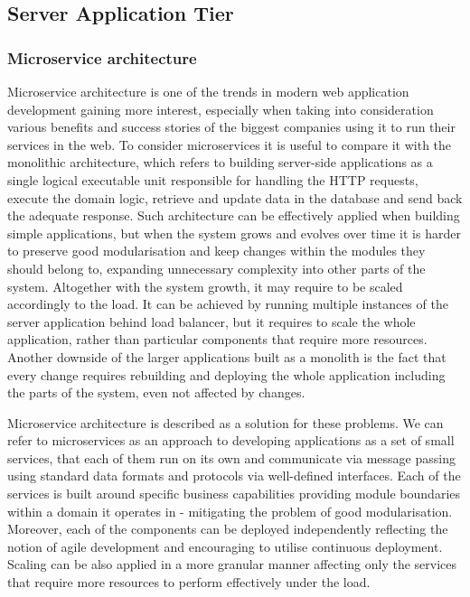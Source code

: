 \subsection{Server Application Tier}


\subsubsection{Microservice architecture}

Microservice architecture is one of the trends in modern web application development gaining more interest, especially when taking into consideration various benefits and success stories of the biggest companies using it to run their services in the web. To consider microservices it is useful to compare it with the monolithic architecture, which refers to building server-side applications as a single logical executable unit responsible for handling the HTTP requests, execute the domain logic, retrieve and update data in the database and send back the adequate response. Such architecture can be effectively applied when building simple applications, but when the system grows and evolves over time it is harder to preserve good modularisation and keep changes within the modules they should belong to, expanding unnecessary complexity into other parts of the system. Altogether with the system growth, it may require to be scaled accordingly to the load. It can be achieved by running multiple instances of the server application behind load balancer, but it requires to scale the whole application, rather than particular components that require more resources. Another downside of the larger applications built as a monolith is the fact that every change requires rebuilding and deploying the whole application including the parts of the system, even not affected by changes.

Microservice architecture is described as a solution for these problems. We can refer to microservices as an approach to developing applications as a set of small services, that each of them run on its own and communicate via message passing using standard data formats and protocols via well-defined interfaces. Each of the services is built around specific business capabilities providing module boundaries within a domain it operates in - mitigating the problem of good modularisation. Moreover, each of the components can be deployed independently reflecting the notion of agile development and encouraging to utilise continuous deployment. Scaling can be also applied in a more granular manner affecting only the services that require more resources to perform effectively under the load. \cite{FowlerMicroservices}

